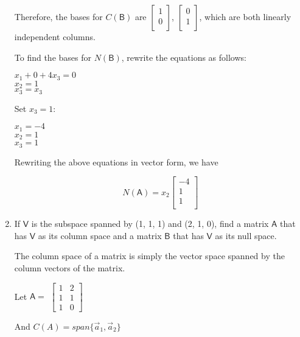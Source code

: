 \documentclass[a4paper, 11pt]{article}
\newcommand{\mat}[1]{\boldsymbol { \mathsf{#1}} }
\begin{document}
\begin{enumerate}
Therefore, the bases for $C(\mat{B})$ are $\begin{bmatrix}
1 \\
0 \\
\end{bmatrix}$, $\begin{bmatrix}
0 \\
1 \\
\end{bmatrix}$, which are both linearly independent columns.

To find the bases for $N(\mat{B})$, rewrite the equations as follows:
\begin{center}
    $x_1 + 0 + 4x_3 = 0$ \\
    $x_2 = 1$ \\
    $x_3 = x_3$ \\
\end{center}

Set $x_3 = 1$:

\begin{center}
    $x_1  = -4$ \\
    $x_2 = 1$ \\
    $x_3 = 1$ \\
\end{center}


Rewriting the above equations in vector form, we have

\begin{equation*}
    N(\mat{A}) = x_2 
    \begin{bmatrix}
    -4 \\
    1 \\
    1 \\
    \end{bmatrix}
\end{equation*}

\item If $\mat V$ is the subspace spanned by (1, 1, 1) and (2, 1, 0), find a matrix $\mat A$ that has $\mat V$ as its column space and a matrix $\mat B$ that has $\mat V$ as its null space.

The column space of a matrix is simply the vector space spanned  by the column vectors of the matrix.

Let $\mat A = $
$
\begin{bmatrix}
1 & 2 \\
1 & 1 \\
1 & 0
\end{bmatrix}
$
 
And $C(A) = span\{\vec a_1, \vec a_2\}$
 

\end{enumerate}
\end{document}
